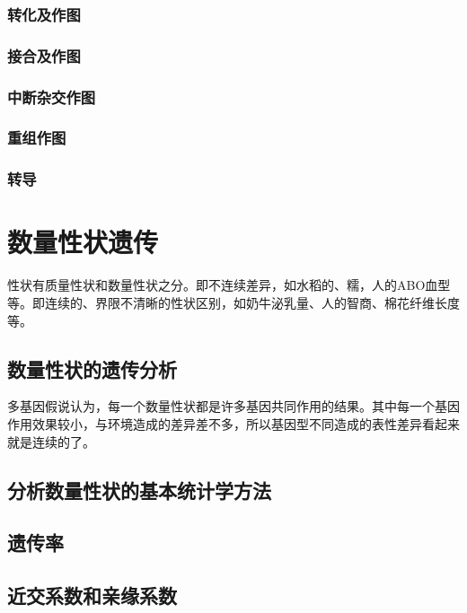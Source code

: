 \subsubsection{转化及作图}

\subsubsection{接合及作图}

\subsubsection{中断杂交作图}

\subsubsection{重组作图}

\subsubsection{转导}


\section{数量性状遗传}

性状有质量性状和数量性状之分。即不连续差异，如水稻的、糯，人的ABO血型等。即连续的、界限不清晰的性状区别，如奶牛泌乳量、人的智商、棉花纤维长度等。

\subsection{数量性状的遗传分析}

多基因假说认为，每一个数量性状都是许多基因共同作用的结果。其中每一个基因作用效果较小，与环境造成的差异差不多，所以基因型不同造成的表性差异看起来就是连续的了。

\subsection{分析数量性状的基本统计学方法}

\subsection{遗传率}

\subsection{近交系数和亲缘系数}

